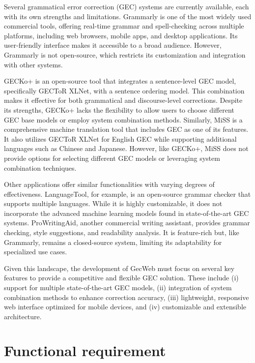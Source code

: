 Several grammatical error correction (GEC) systems are currently available, each with its own strengths and limitations.
Grammarly is one of the most widely used commercial tools, offering real-time grammar and spell-checking across multiple platforms, including web browsers, mobile apps, and desktop applications.
Its user-friendly interface makes it accessible to a broad audience.
However, Grammarly is not open-source, which restricts its customization and integration with other systems.

GECKo+ is an open-source tool that integrates a sentence-level GEC model, specifically GECToR XLNet, with a sentence ordering model.
This combination makes it effective for both grammatical and discourse-level corrections.
Despite its strengths, GECKo+ lacks the flexibility to allow users to choose different GEC base models or employ system combination methods.
Similarly, MiSS is a comprehensive machine translation tool that includes GEC as one of its features.
It also utilizes GECToR XLNet for English GEC while supporting additional languages such as Chinese and Japanese.
However, like GECKo+, MiSS does not provide options for selecting different GEC models or leveraging system combination techniques.

Other applications offer similar functionalities with varying degrees of effectiveness.
LanguageTool, for example, is an open-source grammar checker that supports multiple languages.
While it is highly customizable, it does not incorporate the advanced machine learning models found in state-of-the-art GEC systems.
ProWritingAid, another commercial writing assistant, provides grammar checking, style suggestions, and readability analysis.
It is feature-rich but, like Grammarly, remains a closed-source system, limiting its adaptability for specialized use cases.

Given this landscape, the development of GecWeb must focus on several key features to provide a competitive and flexible GEC solution.
These include (i) support for multiple state-of-the-art GEC models, (ii) integration of system combination methods to enhance correction accuracy, (iii) lightweight, responsive web interface optimized for mobile devices, and (iv) customizable and extensible architecture.

\section{Functional requirement}
\label{functional-requirement}

